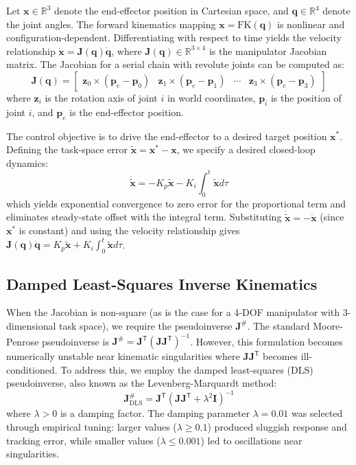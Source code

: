\documentclass[12pt,a4paper,oneside]{report}
\begin{document}
Let $\mathbf{x} \in \mathbb{R}^3$ denote the end-effector position in Cartesian space, and $\mathbf{q} \in \mathbb{R}^4$ denote the joint angles. The forward kinematics mapping $\mathbf{x} = \text{FK}(\mathbf{q})$ is nonlinear and configuration-dependent. Differentiating with respect to time yields the velocity relationship $\dot{\mathbf{x}} = \mathbf{J}(\mathbf{q}) \dot{\mathbf{q}}$, where $\mathbf{J}(\mathbf{q}) \in \mathbb{R}^{3 \times 4}$ is the manipulator Jacobian matrix. The Jacobian for a serial chain with revolute joints can be computed as:
\begin{equation}
\mathbf{J}(\mathbf{q}) = \begin{bmatrix}
\mathbf{z}_0 \times (\mathbf{p}_e - \mathbf{p}_0) & \mathbf{z}_1 \times (\mathbf{p}_e - \mathbf{p}_1) & \cdots & \mathbf{z}_3 \times (\mathbf{p}_e - \mathbf{p}_3)
\end{bmatrix}
\end{equation}
where $\mathbf{z}_i$ is the rotation axis of joint $i$ in world coordinates, $\mathbf{p}_i$ is the position of joint $i$, and $\mathbf{p}_e$ is the end-effector position.

The control objective is to drive the end-effector to a desired target position $\mathbf{x}^*$. Defining the task-space error $\tilde{\mathbf{x}} = \mathbf{x}^* - \mathbf{x}$, we specify a desired closed-loop dynamics:
\begin{equation}
\dot{\tilde{\mathbf{x}}} = -K_p \tilde{\mathbf{x}} - K_i \int_0^t \tilde{\mathbf{x}} d\tau
\end{equation}
which yields exponential convergence to zero error for the proportional term and eliminates steady-state offset with the integral term. Substituting $\dot{\tilde{\mathbf{x}}} = -\dot{\mathbf{x}}$ (since $\mathbf{x}^*$ is constant) and using the velocity relationship gives $\mathbf{J}(\mathbf{q}) \dot{\mathbf{q}} = K_p \tilde{\mathbf{x}} + K_i \int_0^t \tilde{\mathbf{x}} d\tau$.

\subsection{Damped Least-Squares Inverse Kinematics}

When the Jacobian is non-square (as is the case for a 4-DOF manipulator with 3-dimensional task space), we require the pseudoinverse $\mathbf{J}^{\#}$. The standard Moore-Penrose pseudoinverse is $\mathbf{J}^{\#} = \mathbf{J}^{\mathsf{T}} (\mathbf{J} \mathbf{J}^{\mathsf{T}})^{-1}$. However, this formulation becomes numerically unstable near kinematic singularities where $\mathbf{J} \mathbf{J}^{\mathsf{T}}$ becomes ill-conditioned. To address this, we employ the damped least-squares (DLS) pseudoinverse, also known as the Levenberg-Marquardt method:
\begin{equation}
\mathbf{J}^{\#}_{\text{DLS}} = \mathbf{J}^{\mathsf{T}} (\mathbf{J} \mathbf{J}^{\mathsf{T}} + \lambda^2 \mathbf{I})^{-1}
\end{equation}
where $\lambda > 0$ is a damping factor. The damping parameter $\lambda = 0.01$ was selected through empirical tuning: larger values ($\lambda \geq 0.1$) produced sluggish response and tracking error, while smaller values ($\lambda \leq 0.001$) led to oscillations near singularities.
\end{document}

